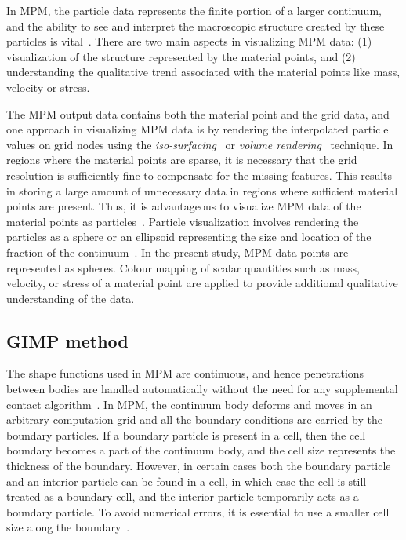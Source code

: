 In MPM, the particle data represents the finite portion of a larger 
continuum, and the ability to see and interpret the 
macroscopic structure created by these particles is vital~\citep{bigler2006}. 
There are two main aspects in visualizing MPM data: (1) visualization of 
the structure represented by the material points, and (2) understanding the 
qualitative trend associated with the material points like mass, velocity or 
stress.

The MPM output data contains both the material point and the grid data, and
one approach in visualizing MPM data is by rendering the interpolated 
particle values on grid nodes using the 
\textit{iso-surfacing}~\citep{lorensen1987} 
or \textit{volume rendering}~\citep{levoy1988} technique. In regions where the 
material points are sparse, it is necessary that the grid resolution is 
sufficiently fine to compensate for the missing features. This results in 
storing a large amount of unnecessary data in regions where sufficient material 
points are present. Thus, it is advantageous to visualize MPM data of the 
material points as particles~\citep{bigler2006}. Particle visualization 
involves rendering the particles as a sphere or an ellipsoid representing the 
size and location of the fraction of the 
continuum~\citep{kuester2001,krogh1997,gumhold2003}. In the present study, MPM 
data points are represented as spheres.  Colour mapping of scalar 
quantities such as mass, velocity, or stress of a material point are applied to 
provide additional qualitative understanding of the data.


\subsection{GIMP method}

The shape functions used in MPM are continuous, and hence penetrations between 
bodies are handled automatically without the need for any supplemental contact 
algorithm~\citep{Chen2002}. In MPM, the continuum body deforms and moves in 
an arbitrary computation grid and all the boundary conditions are carried by 
the boundary particles. If a boundary particle is present in a cell, then the 
cell boundary becomes a part of the continuum body, and the cell size 
represents the thickness of the boundary. However, in certain cases both the 
boundary particle and an interior particle can be found in a cell, in which 
case the cell is still treated as a boundary cell, and the interior particle 
temporarily acts as a boundary particle. To avoid numerical errors, it is 
essential to use a smaller cell size along the boundary~\citep{Chen2002}. 

